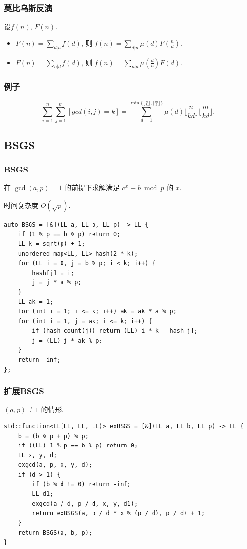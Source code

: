 \documentclass[UTF8, a4paper, titlepage, twoside]{ctexart}
\begin{document}
\subsubsection{ 莫比乌斯反演 }
设$f(n)$, $F(n)$. 

\begin{itemize}
\item $F(n) = \sum_{d|n}f(d)$, 则 $f(n) = \sum_{d|n}\mu(d)F(\frac{n}{d})$.
\item $F(n) = \sum_{n|d}f(d)$, 则 $f(n) = \sum_{n|d}\mu(\frac{d}{n})F(d)$.
\end{itemize}

\subsubsection{ 例子 }
$$
\sum_{i = 1}^n\sum_{j = 1}^m [gcd(i, j) = k] = 
\sum_{d = 1}^{\min\{\lfloor\frac{n}{k}\rfloor,\lfloor\frac{m}{k}\rfloor\}} \mu(d)\lfloor\frac{n}{kd}\rfloor \lfloor\frac{m}{kd}\rfloor.
$$

\subsection{ BSGS }
\subsubsection{ BSGS }
在 $\gcd(a, p) = 1$ 的前提下求解满足 $a ^ x \equiv b \bmod p$ 的 $x$.

时间复杂度 $O(\sqrt{p})$.
\begin{lstlisting}
auto BSGS = [&](LL a, LL b, LL p) -> LL {
    if (1 % p == b % p) return 0;
    LL k = sqrt(p) + 1;
    unordered_map<LL, LL> hash(2 * k);
    for (LL i = 0, j = b % p; i < k; i++) {
        hash[j] = i;
        j = j * a % p;
    }
    LL ak = 1;
    for (int i = 1; i <= k; i++) ak = ak * a % p;
    for (int i = 1, j = ak; i <= k; i++) {
        if (hash.count(j)) return (LL) i * k - hash[j];
        j = (LL) j * ak % p;
    }
    return -inf;
};
\end{lstlisting}

\subsubsection{ 扩展BSGS }
$(a, p) \neq 1$ 的情形.
\begin{lstlisting}
std::function<LL(LL, LL, LL)> exBSGS = [&](LL a, LL b, LL p) -> LL {
    b = (b % p + p) % p;
    if ((LL) 1 % p == b % p) return 0;
    LL x, y, d;
    exgcd(a, p, x, y, d);
    if (d > 1) {
        if (b % d != 0) return -inf;
        LL d1;
        exgcd(a / d, p / d, x, y, d1);
        return exBSGS(a, b / d * x % (p / d), p / d) + 1;
    }
    return BSGS(a, b, p);
}
\end{lstlisting}
\end{document}
